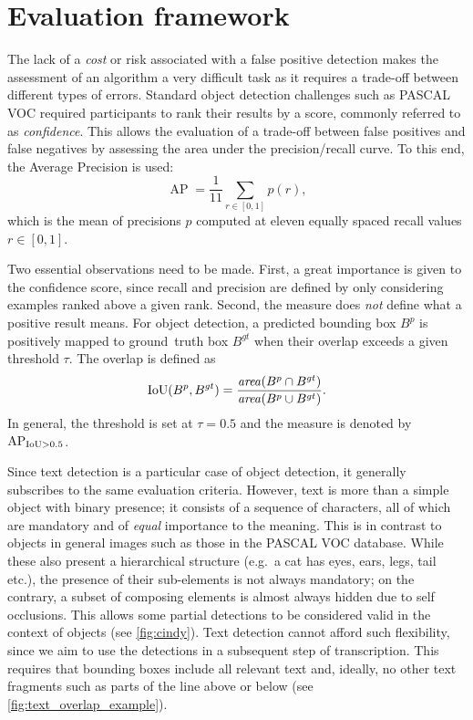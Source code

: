 \section{Evaluation framework}\label{sec:detection_eval}
	The lack of a \emph{cost} or risk associated with a false positive detection makes the assessment of an algorithm a very difficult task as it requires a trade-off between different types of errors. Standard object detection challenges such as PASCAL VOC \citep{pascal_voc} required participants to rank their results by a score, commonly referred to as \emph{confidence}. This allows the evaluation of a trade-off between false positives and false negatives by assessing the area under the precision/recall curve. To this end, the Average Precision is used:\[
		\operatorname{AP} = \frac{1}{11} \sum_{r \in [0,1]} p(r),
	\] which is the mean of precisions \(p\) computed at eleven equally spaced recall values \(r \in [0,1]\).

	Two essential observations need to be made. First, a great importance is given to the confidence score, since recall and precision are defined by only considering examples ranked above a given rank. Second, the measure does \emph{not} define what a positive result means. For object detection, a predicted bounding box \(B^p\) is positively mapped to \mbox{ground truth} box \(B^{gt}\) when their overlap exceeds a given threshold \(\tau\). The overlap is defined as \[
		\operatorname{IoU}(B^p, B^{gt}) = \frac{\mathit{area}(B^p \cap B^{gt})}{\mathit{area}(B^p \cup B^{gt})}.
	\] In general, the threshold is set at \(\tau = 0.5\) and the measure is denoted by \(\operatorname{\operatorname{AP}_{\operatorname{IoU} > 0.5}}\).


	Since text detection is a particular case of object detection, it generally subscribes to the same evaluation criteria. However, text is more than a simple object with binary presence; it consists of a sequence of characters, all of which are mandatory and of \emph{equal} importance to the meaning. This is in contrast to objects in general images such as those in the PASCAL VOC database. While these also present a hierarchical structure (e.g.\ a cat has eyes, ears, legs, tail etc.), the presence of their sub-elements is not always mandatory; on the contrary, a subset of composing elements is almost always hidden due to self occlusions. This allows some partial detections to be considered valid in the context of objects (see \autoref{fig:cindy}). Text detection cannot afford such flexibility, since we aim to use the detections in a subsequent step of transcription. This requires that bounding boxes include all relevant text and, ideally, no other text fragments such as parts of the line above or below (see \autoref{fig:text_overlap_example}).

